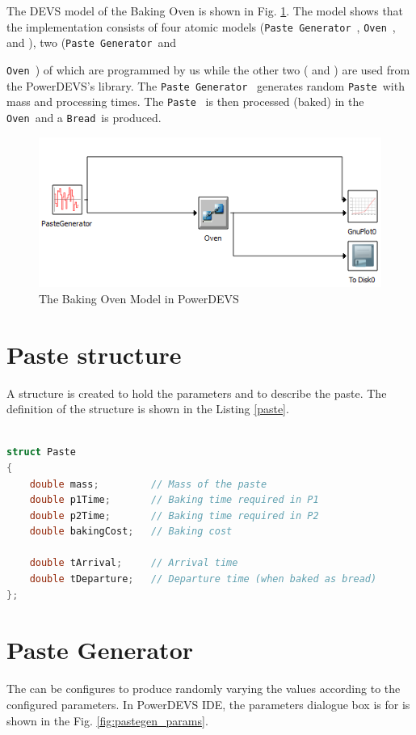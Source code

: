 \documentclass[titlepage]{report}%
\newcommand{\oven}{\texttt{Oven}~}
\newcommand{\pgen}{\texttt{Paste Generator}~}
\newcommand{\paste}{\texttt{Paste}~}
\newcommand{\bread}{\texttt{Bread}~}
\begin{document}
The DEVS model of the Baking Oven is shown in Fig. \ref{fig:model}. The model shows that the 
implementation consists of four atomic models (\pgen, \oven, 
{} and {}), two (\pgen and 
{\oven) of which are programmed by us while the other two ({} and 
{}) are used from the PowerDEVS's library. The \pgen 
generates random \paste with mass and processing times. The \paste 
is then processed (baked) in the \oven and a \bread is produced. 

\begin{figure}[htbp]
	\centering
		\includegraphics[scale=0.7]{model.PNG}
	\caption{The Baking Oven Model in PowerDEVS}
	\label{fig:model}
\end{figure}

\section{Paste structure}

A structure is created to hold the parameters and to describe the paste. The definition of the structure is shown in the Listing \ref{paste}.

\begin{lstlisting}[caption={Paste structure}, language=c++, label={paste}]

struct Paste
{
    double mass;         // Mass of the paste
    double p1Time;       // Baking time required in P1
    double p2Time;       // Baking time required in P2
    double bakingCost;   // Baking cost
	
    double tArrival;     // Arrival time
    double tDeparture;   // Departure time (when baked as bread)
};

\end{lstlisting}


\section{Paste Generator}
The {} can be configures to produce randomly varying the values according to the configured parameters. In PowerDEVS IDE, the parameters dialogue box is for {} is shown in the Fig. \ref{fig:pastegen_params}.

}
\end{document}
